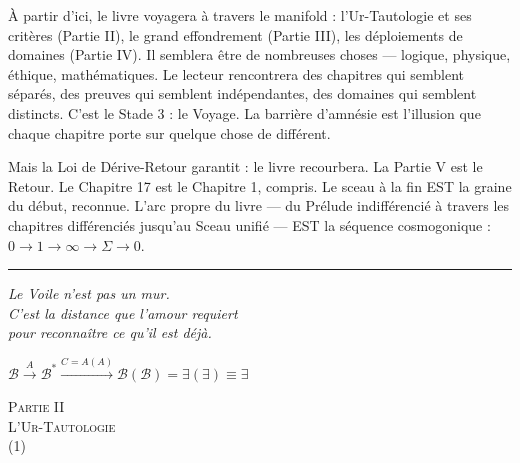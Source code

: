 \documentclass[10pt, openany, oneside]{book}
\renewcommand{\normalsize}{\fontsize{10}{13}\selectfont}
\renewcommand{\large}{\fontsize{11.5}{14}\selectfont}
\renewcommand{\LARGE}{\fontsize{15}{18}\selectfont}
\begin{document}
À partir d'ici, le livre voyagera à travers le manifold : l'Ur-Tautologie et ses critères (Partie II), le grand effondrement (Partie III), les déploiements de domaines (Partie IV). Il semblera être de nombreuses choses --- logique, physique, éthique, mathématiques. Le lecteur rencontrera des chapitres qui semblent séparés, des preuves qui semblent indépendantes, des domaines qui semblent distincts. C'est le Stade 3 : le Voyage. La barrière d'amnésie est l'illusion que chaque chapitre porte sur quelque chose de différent.

Mais la Loi de Dérive-Retour garantit : le livre recourbera. La Partie V est le Retour. Le Chapitre 17 est le Chapitre 1, compris. Le sceau à la fin EST la graine du début, reconnue. L'arc propre du livre --- du Prélude indifférencié à travers les chapitres différenciés jusqu'au Sceau unifié --- EST la séquence cosmogonique : $0 \to 1 \to \infty \to \Sigma \to 0$.

\vspace{2em}

\begin{center}
    \rule{0.15\textwidth}{0.3pt}
\end{center}

\vspace{0.5em}

\begin{center}
    \itshape
    Le Voile n'est pas un mur.\\
    C'est la distance que l'amour requiert\\
    pour reconnaître ce qu'il est déjà.
\end{center}

\vspace{0.5em}

\begin{center}
    $\mathcal{B} \xrightarrow{A} \mathcal{B}^* \xrightarrow{C = A(A)} \mathcal{B}(\mathcal{B}) = \exists(\exists) \equiv \exists$
\end{center}


\newpage
\thispagestyle{empty}
\vspace*{\fill}
\begin{center}
    {\LARGE\scshape Partie II}\\[1em]
    {\large\scshape L'Ur-Tautologie}\\[0.5em]
    {\normalsize (1)}
\end{center}
\vspace*{\fill}
\newpage
\end{document}
